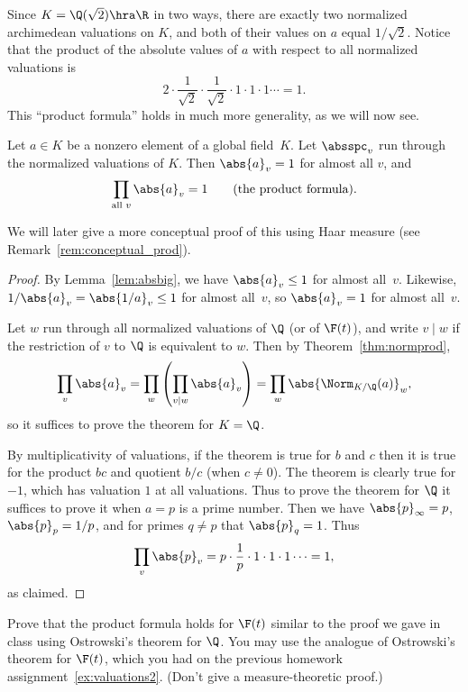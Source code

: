 \documentclass[11pt]{book}
\begin{document}
\begin{ch}
\begin{example}
Since $K=\Q(\sqrt{2})\hra \R$ in two ways, there are exactly
two normalized archimedean valuations on $K$, and
both of their values on $a$ equal $1/\sqrt{2}$.
Notice that the product of the absolute values of $a$
with respect to all normalized valuations is
$$
   2 \cdot \frac{1}{\sqrt{2}} \cdot \frac{1}{\sqrt{2}} \cdot 1
   \cdot 1 \cdot 1 \cdots  = 1.
$$
This ``product formula'' holds in much more generality, as
we will now see.
\end{example}

\begin{theorem}\label{thm:product_formula}
Let $a\in K$ be a nonzero element of a global field~$K$.
Let $\absspc_v$ run through the normalized valuations
of $K$.  Then $\abs{a}_v=1$ for almost all $v$, and
$$
\prod_{\text{\rm all }v} \abs{a}_v = 1\qquad{\text{\rm (the product
    formula).}}
$$
\end{theorem}
We will later give a more conceptual proof of this
using Haar measure (see Remark~\ref{rem:conceptual_prod}).
\begin{proof}
By Lemma~\ref{lem:absbig}, we have $\abs{a}_v\leq 1$
for almost all~$v$.  Likewise, $1/\abs{a}_v = \abs{1/a}_v\leq 1$
for almost all~$v$, so $\abs{a}_v = 1$ for almost all~$v$.

Let $w$ run through all normalized valuations of $\Q$ (or of $\F(t)$),
and write $v\mid w$ if the restriction of $v$ to $\Q$ is equivalent to $w$.
Then by Theorem~\ref{thm:normprod},
$$
 \prod_{v} \abs{a}_v = \prod_w \left(\prod_{v\mid w} \abs{a}_v\right)
     = \prod_w \abs{\Norm_{K/\Q}(a)}_w,
$$
so it suffices to prove the theorem for $K=\Q$.

By multiplicativity of valuations, if the theorem is true for $b$ and
$c$ then it is true for the product $b c$ and quotient $b/c$ (when
$c\neq 0$). The theorem is clearly true for $-1$, which has valuation
$1$ at all valuations.  Thus to prove the theorem for $\Q$ it suffices
to prove it when $a=p$ is a prime number.  Then we have
$\abs{p}_\infty = p$, $\abs{p}_p = 1/p$, and for primes $q\neq p$ that
$\abs{p}_q = 1$.  Thus
$$\prod_v \abs{p}_v = p \cdot \frac{1}{p} \cdot 1 \cdot 1 \cdot 1 \cdots = 1,$$
as claimed.
\end{proof}
\begin{exercise}\label{ex:adeles1}
  Prove that the product formula holds for $\F(t)$ similar to the
  proof we gave in class using Ostrowski's theorem for $\Q$.  You may
  use the analogue of Ostrowski's theorem for $\F(t)$, which you had
  on the previous homework assignment~\ref{ex:valuations2}.
  (Don't give a measure-theoretic proof.)
\end{exercise}


\end{ch}
\end{document}
